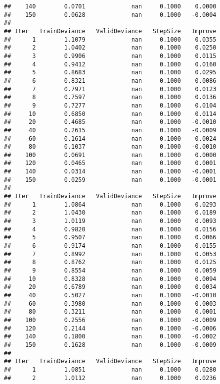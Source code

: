 \documentclass[]{article}
\begin{document}
\begin{verbatim}
##    140        0.0701             nan     0.1000    0.0000
##    150        0.0628             nan     0.1000   -0.0004
## 
## Iter   TrainDeviance   ValidDeviance   StepSize   Improve
##      1        1.1079             nan     0.1000    0.0355
##      2        1.0402             nan     0.1000    0.0250
##      3        0.9906             nan     0.1000    0.0115
##      4        0.9412             nan     0.1000    0.0160
##      5        0.8683             nan     0.1000    0.0295
##      6        0.8321             nan     0.1000    0.0086
##      7        0.7971             nan     0.1000    0.0123
##      8        0.7597             nan     0.1000    0.0136
##      9        0.7277             nan     0.1000    0.0104
##     10        0.6850             nan     0.1000    0.0114
##     20        0.4685             nan     0.1000   -0.0010
##     40        0.2615             nan     0.1000   -0.0009
##     60        0.1614             nan     0.1000    0.0024
##     80        0.1037             nan     0.1000   -0.0010
##    100        0.0691             nan     0.1000    0.0000
##    120        0.0465             nan     0.1000    0.0001
##    140        0.0314             nan     0.1000   -0.0001
##    150        0.0259             nan     0.1000   -0.0001
## 
## Iter   TrainDeviance   ValidDeviance   StepSize   Improve
##      1        1.0864             nan     0.1000    0.0293
##      2        1.0430             nan     0.1000    0.0189
##      3        1.0119             nan     0.1000    0.0093
##      4        0.9820             nan     0.1000    0.0156
##      5        0.9507             nan     0.1000    0.0066
##      6        0.9174             nan     0.1000    0.0155
##      7        0.8992             nan     0.1000    0.0053
##      8        0.8762             nan     0.1000    0.0125
##      9        0.8554             nan     0.1000    0.0059
##     10        0.8328             nan     0.1000    0.0094
##     20        0.6789             nan     0.1000    0.0034
##     40        0.5027             nan     0.1000   -0.0010
##     60        0.3980             nan     0.1000    0.0003
##     80        0.3211             nan     0.1000    0.0001
##    100        0.2556             nan     0.1000   -0.0009
##    120        0.2144             nan     0.1000   -0.0006
##    140        0.1800             nan     0.1000   -0.0002
##    150        0.1628             nan     0.1000   -0.0009
## 
## Iter   TrainDeviance   ValidDeviance   StepSize   Improve
##      1        1.0851             nan     0.1000    0.0280
##      2        1.0112             nan     0.1000    0.0236

\end{verbatim}
\end{document}
